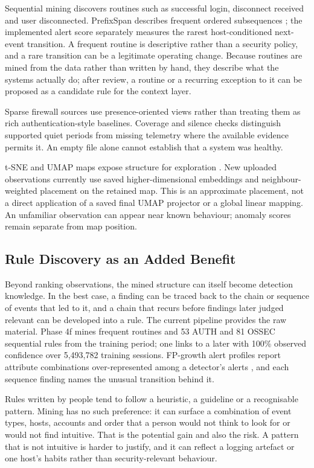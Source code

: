 \documentclass[11pt,a4paper]{article}
\newcommand{\tok}[1]{\texttt{\detokenize{#1}}}
\begin{document}
Sequential mining discovers routines such as successful login, disconnect received and user disconnected. PrefixSpan describes frequent ordered subsequences \cite{ref4}; the implemented alert score separately measures the rarest host-conditioned next-event transition. A frequent routine is descriptive rather than a security policy, and a rare transition can be a legitimate operating change. Because routines are mined from the data rather than written by hand, they describe what the systems actually do; after review, a routine or a recurring exception to it can be proposed as a candidate rule for the context layer.

Sparse firewall sources use presence-oriented views rather than treating them as rich authentication-style baselines. Coverage and silence checks distinguish supported quiet periods from missing telemetry where the available evidence permits it. An empty file alone cannot establish that a system was healthy.

t-SNE and UMAP maps expose structure for exploration \cite{ref7,ref8}. New uploaded observations currently use saved higher-dimensional embeddings and neighbour-weighted placement on the retained map. This is an approximate placement, not a direct application of a saved final UMAP projector or a global linear mapping. An unfamiliar observation can appear near known behaviour; anomaly scores remain separate from map position.

\subsection{Rule Discovery as an Added Benefit}\label{sec:core-rules}

Beyond ranking observations, the mined structure can itself become detection knowledge. In the best case, a finding can be traced back to the chain or sequence of events that led to it, and a chain that recurs before findings later judged relevant can be developed into a rule. The current pipeline provides the raw material. Phase 4f mines frequent routines and 53 AUTH and 81 OSSEC sequential rules from the training period; one links \tok{SSH_DISCONNECT_RECEIVED} to a later \tok{SSH_USER_DISCONNECTED} with 100\% observed confidence over 5,493,782 training sessions. FP-growth alert profiles report attribute combinations over-represented among a detector's alerts \cite{ref5}, and each sequence finding names the unusual transition behind it.

Rules written by people tend to follow a heuristic, a guideline or a recognisable pattern. Mining has no such preference: it can surface a combination of event types, hosts, accounts and order that a person would not think to look for or would not find intuitive. That is the potential gain and also the risk. A pattern that is not intuitive is harder to justify, and it can reflect a logging artefact or one host's habits rather than security-relevant behaviour.
\end{document}
